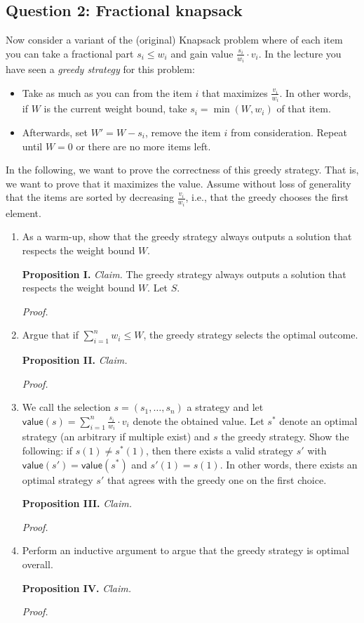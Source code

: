 \subsection*{Question 2: Fractional knapsack}
Now consider a variant of the (original) Knapsack problem where of each item you can take a fractional part $s_i \leq w_i$ and gain value $\frac{s_i}{w_i} \cdot v_i$.
In the lecture you have seen a \emph{greedy strategy} for this problem:
\begin{itemize}
    \item Take as much as you can from the item $i$ that maximizes $\frac{v_i}{w_i}$. In other words, if $W$ is the current weight bound, take $s_i=\min(W,w_i)$ of that item.
    \item Afterwards, set $W' = W-s_i$, remove the item $i$ from consideration. Repeat until $W=0$ or there are no more items left.
\end{itemize}
In the following, we want to prove the correctness of this greedy strategy. That is, we want to prove that it maximizes the value. Assume without loss of generality that the items are sorted by decreasing $\frac{v_i}{w_i}$, i.e., that the greedy chooses the first element.
\begin{enumerate}
    \item As a warm-up, show that the greedy strategy always outputs a solution that respects the weight bound $W$.
\begin{solution}
\textbf{Proposition I. }\textit{Claim. }The greedy strategy always outputs a solution that respects the weight bound $W$. Let $S$.

\textit{Proof. }

\end{solution}
\item Argue that if $\sum_{i=1}^n w_i \leq W$, the greedy strategy selects the optimal outcome.
\begin{solution}
\textbf{Proposition II. }\textit{Claim. }

\textit{Proof. }
\end{solution}
\item We call the selection $s = (s_1,\ldots,s_n)$ a strategy and let 
$\mathsf{value}(s) = \sum_{i=1}^n \frac{s_i}{w_i} \cdot v_i$ 
denote the obtained value. Let $s^*$ denote an optimal strategy (an arbitrary if multiple exist) and $s$ the greedy strategy.
Show the following: if $s(1) \neq s^*(1)$, then there exists a valid strategy $s'$ with $\mathsf{value}(s') = \mathsf{value}(s^*)$ and $s'(1) = s(1)$. In other words, there exists an optimal strategy $s'$ that agrees with the greedy one on the first choice.
\begin{solution}
\textbf{Proposition III. }\textit{Claim. }

\textit{Proof. }
\end{solution}
\item Perform an inductive argument to argue that the greedy strategy is optimal overall.
\begin{solution}
\textbf{Proposition IV. }\textit{Claim. }

\textit{Proof. }
\end{solution}
\end{enumerate}





